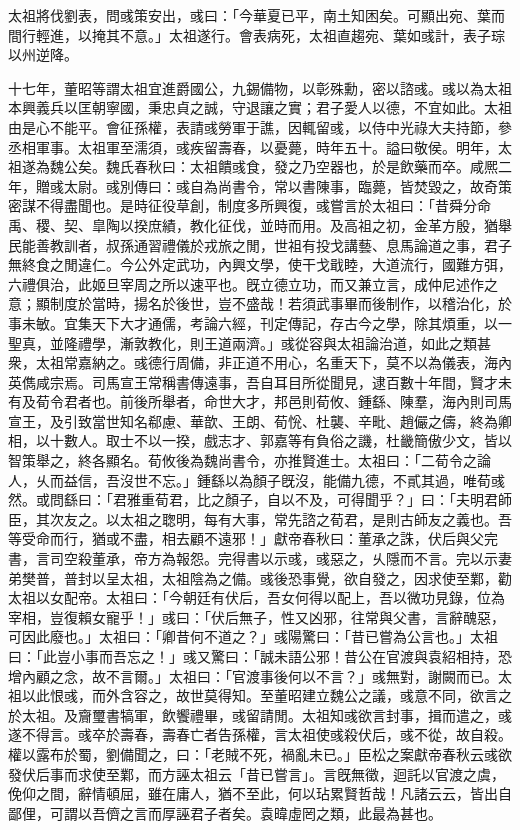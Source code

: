 \begin{pinyinscope}
太祖將伐劉表，問彧策安出，彧曰：「今華夏已平，南土知困矣。可顯出宛、葉而間行輕進，以掩其不意。」太祖遂行。會表病死，太祖直趨宛、葉如彧計，表子琮以州逆降。

十七年，董昭等謂太祖宜進爵國公，九錫備物，以彰殊勳，密以諮彧。彧以為太祖本興義兵以匡朝寧國，秉忠貞之誠，守退讓之實；君子愛人以德，不宜如此。太祖由是心不能平。會征孫權，表請彧勞軍于譙，因輒留彧，以侍中光祿大夫持節，參丞相軍事。太祖軍至濡須，彧疾留壽春，以憂薨，時年五十。謚曰敬侯。明年，太祖遂為魏公矣。魏氏春秋曰：太祖饋彧食，發之乃空器也，於是飲藥而卒。咸熈二年，贈彧太尉。彧別傳曰：彧自為尚書令，常以書陳事，臨薨，皆焚毀之，故奇策密謀不得盡聞也。是時征役草創，制度多所興復，彧嘗言於太祖曰：「昔舜分命禹、稷、契、皐陶以揆庶績，教化征伐，並時而用。及高祖之初，金革方殷，猶舉民能善教訓者，叔孫通習禮儀於戎旅之閒，世祖有投戈講藝、息馬論道之事，君子無終食之閒違仁。今公外定武功，內興文學，使干戈戢睦，大道流行，國難方弭，六禮俱治，此姬旦宰周之所以速平也。旣立德立功，而又兼立言，成仲尼述作之意；顯制度於當時，揚名於後世，豈不盛哉！若須武事畢而後制作，以稽治化，於事未敏。宜集天下大才通儒，考論六經，刊定傳記，存古今之學，除其煩重，以一聖真，並隆禮學，漸敦教化，則王道兩濟。」彧從容與太祖論治道，如此之類甚衆，太祖常嘉納之。彧德行周備，非正道不用心，名重天下，莫不以為儀表，海內英儁咸宗焉。司馬宣王常稱書傳遠事，吾自耳目所從聞見，逮百數十年間，賢才未有及荀令君者也。前後所舉者，命世大才，邦邑則荀攸、鍾繇、陳羣，海內則司馬宣王，及引致當世知名郗慮、華歆、王朗、荀恱、杜襲、辛毗、趙儼之儔，終為卿相，以十數人。取士不以一揆，戲志才、郭嘉等有負俗之譏，杜畿簡傲少文，皆以智策舉之，終各顯名。荀攸後為魏尚書令，亦推賢進士。太祖曰：「二荀令之論人，乆而益信，吾沒世不忘。」鍾繇以為顏子旣沒，能備九德，不貳其過，唯荀彧然。或問繇曰：「君雅重荀君，比之顏子，自以不及，可得聞乎？」曰：「夫明君師臣，其次友之。以太祖之聦明，每有大事，常先諮之荀君，是則古師友之義也。吾等受命而行，猶或不盡，相去顧不遠邪！」獻帝春秋曰：董承之誅，伏后與父完書，言司空殺董承，帝方為報怨。完得書以示彧，彧惡之，乆隱而不言。完以示妻弟樊普，普封以呈太祖，太祖陰為之備。彧後恐事覺，欲自發之，因求使至鄴，勸太祖以女配帝。太祖曰：「今朝廷有伏后，吾女何得以配上，吾以微功見錄，位為宰相，豈復賴女寵乎！」彧曰：「伏后無子，性又凶邪，往常與父書，言辭醜惡，可因此廢也。」太祖曰：「卿昔何不道之？」彧陽驚曰：「昔已嘗為公言也。」太祖曰：「此豈小事而吾忘之！」彧又驚曰：「誠未語公邪！昔公在官渡與袁紹相持，恐增內顧之念，故不言爾。」太祖曰：「官渡事後何以不言？」彧無對，謝闕而已。太祖以此恨彧，而外含容之，故世莫得知。至董昭建立魏公之議，彧意不同，欲言之於太祖。及齎璽書犒軍，飲饗禮畢，彧留請閒。太祖知彧欲言封事，揖而遣之，彧遂不得言。彧卒於壽春，壽春亡者告孫權，言太祖使彧殺伏后，彧不從，故自殺。權以露布於蜀，劉備聞之，曰：「老賊不死，禍亂未已。」臣松之案獻帝春秋云彧欲發伏后事而求使至鄴，而方誣太祖云「昔已嘗言」。言旣無徵，迴託以官渡之虞，俛仰之間，辭情頓屈，雖在庸人，猶不至此，何以玷累賢哲哉！凡諸云云，皆出自鄙俚，可謂以吾儕之言而厚誣君子者矣。袁暐虛罔之類，此最為甚也。


\end{pinyinscope}
